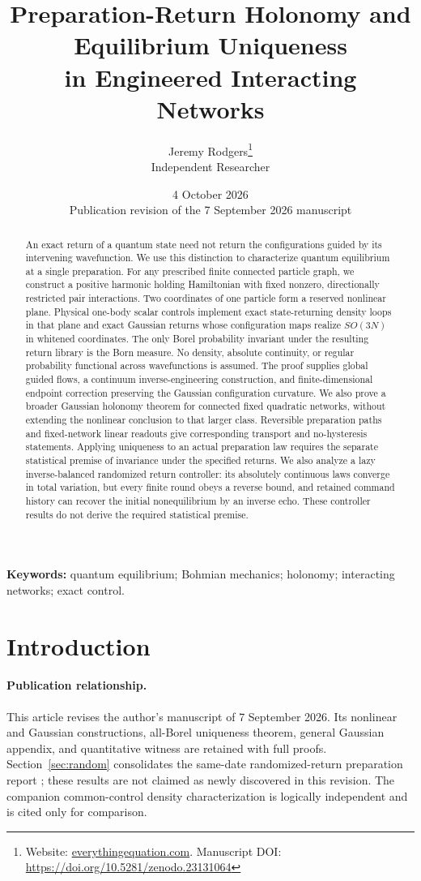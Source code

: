 \documentclass[11pt]{article}
\title{Preparation-Return Holonomy and Equilibrium Uniqueness\\
in Engineered Interacting Networks}
\author{Jeremy Rodgers\thanks{Website: \href{https://everythingequation.com}{everythingequation.com}. Manuscript DOI: \url{https://doi.org/10.5281/zenodo.23131064}}\\\small Independent Researcher}
\date{4 October 2026\\\small Publication revision of the 7 September 2026 manuscript}
\numberwithin{equation}{section}
\theoremstyle{definition}
\begin{document}
\maketitle

\begin{abstract}
An exact return of a quantum state need not return the configurations guided
by its intervening wavefunction. We use this distinction to characterize
quantum equilibrium at a single preparation. For any prescribed finite
connected particle graph, we construct a positive harmonic holding
Hamiltonian with fixed nonzero, directionally restricted pair interactions.
Two coordinates of one particle form a reserved nonlinear plane. Physical
one-body scalar controls implement exact state-returning density loops in
that plane and exact Gaussian returns whose configuration maps realize
$SO(3N)$ in whitened coordinates. The only Borel probability invariant under
the resulting return library is the Born measure. No density, absolute
continuity, or regular probability functional across wavefunctions is assumed.
The proof supplies global guided flows, a continuum inverse-engineering
construction, and finite-dimensional endpoint correction preserving the
Gaussian configuration curvature. We also prove a broader Gaussian
holonomy theorem for connected fixed quadratic networks, without extending
the nonlinear conclusion to that larger class. Reversible preparation
paths and fixed-network linear readouts give corresponding transport and
no-hysteresis statements. Applying uniqueness to an actual preparation law
requires the separate statistical premise of invariance under the specified
returns. We also analyze a lazy inverse-balanced randomized return controller:
its absolutely continuous laws converge in total variation, but every finite
round obeys a reverse bound, and retained command history can recover the
initial nonequilibrium by an inverse echo. These controller results do not
derive the required statistical premise.
\end{abstract}

\noindent\textbf{Keywords:} quantum equilibrium; Bohmian mechanics; holonomy; interacting networks; exact control.

\section{Introduction}
\paragraph{Publication relationship.}
This article revises the author's manuscript of 7 September 2026. Its nonlinear and Gaussian constructions, all-Borel uniqueness theorem, general Gaussian appendix, and quantitative witness are retained with full proofs. Section~\ref{sec:random} consolidates the same-date randomized-return preparation report \citep{RandomizedReport}; these results are not claimed as newly discovered in this revision. The companion common-control density characterization is logically independent and is cited only for comparison.
\end{document}
